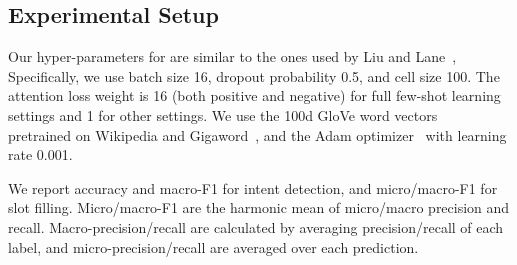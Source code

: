 

\subsection{Experimental Setup}
Our hyper-parameters for \BLSTM are similar to the ones used by Liu and Lane~,
Specifically, we use batch size 16, dropout probability 0.5, and \BLSTM cell size 100.
The attention loss weight is 16 (both positive and negative) for full few-shot learning settings and 1 for other settings.
We use the 100d GloVe word vectors ~\cite{pennington2014glove} pretrained on Wikipedia and Gigaword~\cite{parker2011english}, and the Adam optimizer~\cite{kingma2014adam} with learning rate 0.001.

We report accuracy and macro-F1 for intent detection, and micro/macro-F1 for slot filling.
Micro/macro-F1 are the harmonic mean of micro/macro precision and recall.
Macro-precision/recall are calculated by averaging precision/recall of each label, and micro-precision/recall are averaged over each prediction.

